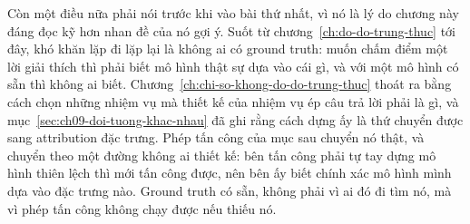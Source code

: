 %
Còn một điều nữa phải nói trước khi vào bài thứ nhất, vì nó là lý do chương này
đáng đọc kỹ hơn nhan đề của nó gợi ý. Suốt từ chương~\ref{ch:do-do-trung-thuc}
tới đây, khó khăn lặp đi lặp lại là không ai có ground truth: muốn chấm điểm
một lời giải thích thì phải biết mô hình thật sự dựa vào cái gì, và với một mô
hình có sẵn thì không ai biết. Chương~\ref{ch:chi-so-khong-do-do-trung-thuc}
thoát ra bằng cách chọn những nhiệm vụ mà thiết kế của nhiệm vụ ép câu trả lời
phải là gì, và mục~\ref{sec:ch09-doi-tuong-khac-nhau} đã ghi rằng cách dựng ấy
là thứ chuyển được sang attribution đặc trưng. Phép tấn công của mục sau chuyển
nó thật, và chuyển theo một đường không ai thiết kế: bên tấn công phải tự tay
dựng mô hình thiên lệch thì mới tấn công được, nên bên ấy biết chính xác mô
hình mình dựa vào đặc trưng nào. Ground truth có sẵn, không phải vì ai đó đi
tìm nó, mà vì phép tấn công không chạy được nếu thiếu nó.

%
